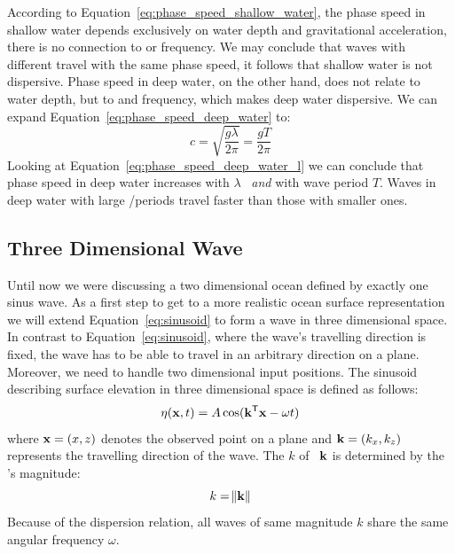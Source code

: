 %
According to Equation~\ref{eq:phase_speed_shallow_water}, the phase speed in shallow water depends exclusively
on water depth and gravitational acceleration, there is no connection to \wavelength or frequency.
We may conclude that waves with different \wavelengths travel with the same phase speed, it follows that
shallow water is not dispersive. Phase speed in deep water, on the other hand,
does not relate to water depth, but to \wavelength and frequency, which makes deep water dispersive.
We can expand Equation~\ref{eq:phase_speed_deep_water} to:
%
\begin{equation}
\label{eq:phase_speed_deep_water_l}
 c = \sqrt{\frac{g\lambda}{2\pi}} = \frac{gT}{2\pi}
\end{equation}
%
Looking at Equation~\ref{eq:phase_speed_deep_water_l} we can conclude that phase speed in deep water increases
with \wavelength $\lambda$ ~\emph{and} with wave period $T$. Waves in deep water with large \wavelengths/periods
travel faster than those with smaller ones.
%
\subsection{Three Dimensional Wave}
Until now we were discussing a two dimensional ocean defined by exactly one sinus wave. As a first
step to get to a more realistic ocean surface representation we will extend Equation~\ref{eq:sinusoid}
to form a wave in three dimensional space. In contrast to Equation~\ref{eq:sinusoid}, where the wave's
travelling direction is fixed, the wave has to be able to travel in an arbitrary direction on a plane.
Moreover, we need to handle two dimensional input positions. The sinusoid describing surface elevation
in three dimensional space is defined as follows:
\begin{equation}
\label{eq:sinusoid_3d}
 \eta(\mathbf{x}, t) = A\cos(\mathbf{k}^{\mathsf{T}}\mathbf{x} - \omega t)
\end{equation}
where $\mathbf{x} = (x, z)$ denotes the observed point on a plane and $\mathbf{k} = (k_x, k_z)$ represents
the travelling direction of the wave. The \wavenumber $k$ of~\emph{\wavevector} $\mathbf{k}$ is determined by
the \wavevector's magnitude:
\begin{equation*}
 k = \norm{\mathbf{k}}
\end{equation*}
Because of the dispersion relation, all waves of same magnitude $k$ share the
same angular frequency $\omega$.

